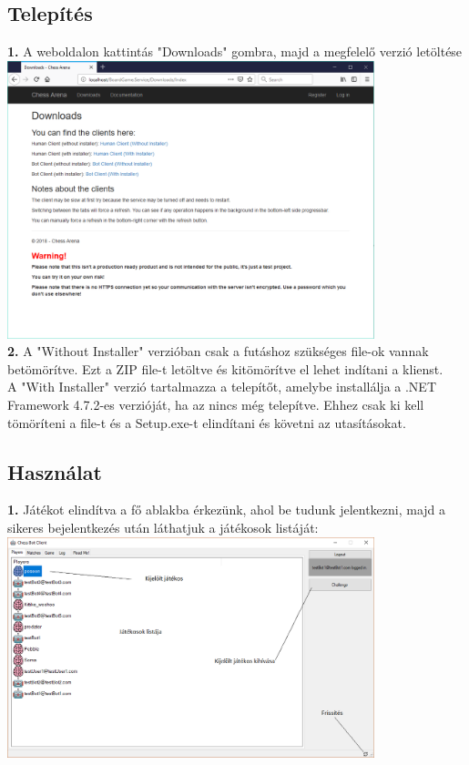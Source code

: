 \documentclass[twoside, a4paper, 12pt]{article}
\begin{document}
\subsection{Telepítés}
\noindent \textbf{1.} A weboldalon kattintás "Downloads" gombra, majd a megfelelő verzió letöltése \\
\includegraphics[width=0.8\textwidth]{img/service_downloads.png} \\
\noindent \textbf{2.} A "Without Installer" verzióban csak a futáshoz szükséges file-ok vannak betömörítve. Ezt a ZIP file-t letöltve és kitömörítve el lehet indítani a klienst. \\
A "With Installer" verzió tartalmazza a telepítőt, amelybe installálja a .NET Framework 4.7.2-es verzióját, ha az nincs még telepítve. Ehhez csak ki kell tömöríteni a file-t és a Setup.exe-t elindítani és követni az utasításokat.
\subsection{Használat}
\noindent \textbf{1.} Játékot elindítva a fő ablakba érkezünk, ahol be tudunk jelentkezni, majd a sikeres bejelentkezés után láthatjuk a játékosok listáját: \\
\includegraphics[width=0.8\textwidth]{img/botClient_1.png} \\
\end{document}
